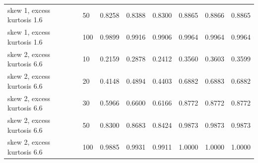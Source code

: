 \begin{table}[htbp]
\begin{tabular}{llrrrrrr}
skew 1, excess kurtosis 1.6 &  50 & 0.8258 & 0.8388 & 0.8300 & 0.8865 & 0.8866 & 0.8865 \\
skew 1, excess kurtosis 1.6 & 100 & 0.9899 & 0.9916 & 0.9906 & 0.9964 & 0.9964 & 0.9964 \\
skew 2, excess kurtosis 6.6 &  10 & 0.2159 & 0.2878 & 0.2412 & 0.3560 & 0.3603 & 0.3599 \\
skew 2, excess kurtosis 6.6 &  20 & 0.4148 & 0.4894 & 0.4403 & 0.6882 & 0.6883 & 0.6882 \\
skew 2, excess kurtosis 6.6 &  30 & 0.5966 & 0.6600 & 0.6166 & 0.8772 & 0.8772 & 0.8772 \\
skew 2, excess kurtosis 6.6 &  50 & 0.8300 & 0.8683 & 0.8424 & 0.9873 & 0.9873 & 0.9873 \\
skew 2, excess kurtosis 6.6 & 100 & 0.9885 & 0.9931 & 0.9911 & 1.0000 & 1.0000 & 1.0000 \\
\hline
\end{tabular}
\end{table}
